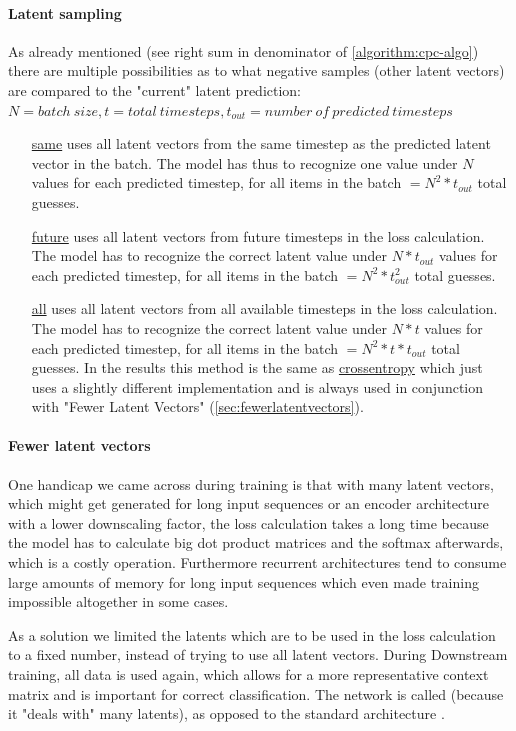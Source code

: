 \paragraph{Latent sampling}
As already mentioned (see right sum in denominator of \autoref{algorithm:cpc-algo}) there are multiple possibilities as to what negative samples (other latent vectors) are compared to the "current" latent prediction:
$N = \mathit{batch\ size}, t=\mathit{total\ timesteps}, t_{out}=\mathit{number\ of\ predicted\ timesteps}$
\begin{itemize}
	\item[\underline{same}] uses all latent vectors from the same timestep as the predicted latent vector in the batch. The model has thus to recognize one value under $N$ values for each predicted timestep, for all items in the batch $=N^2*t_{out}$ total guesses.
	\item[\underline{future}] uses all latent vectors from future timesteps in the loss calculation. The model has to recognize the correct latent value under $N*t_{out}$ values for each predicted timestep, for all items in the batch $=N^2*t_{out}^2$ total guesses.
	\item[\underline{all}] uses all latent vectors from all available timesteps in the loss calculation. The model has to recognize the correct latent value under $N*t$ values for each predicted timestep, for all items in the batch $=N^2*t*t_{out}$ total guesses. In the results this method is the same as \underline{crossentropy} which just uses a slightly different implementation and is always used in conjunction with "Fewer Latent Vectors" (\autoref{sec:fewerlatentvectors}).
\end{itemize}

\paragraph{Fewer latent vectors}\label{sec:fewerlatentvectors}
One handicap we came across during training is that with many latent vectors, which might get generated for long input sequences or an encoder architecture with a lower downscaling factor, the loss calculation takes a long time because the model has to calculate big dot product matrices and the softmax afterwards, which is a costly operation. Furthermore recurrent architectures tend to consume large amounts of memory for long input sequences which even made training impossible altogether in some cases.

As a solution we limited the latents which are to be used in the loss calculation to a fixed number, instead of trying to use all latent vectors. During Downstream training, all data is used again, which allows for a more representative context matrix and is important for correct classification. The network is called  (because it "deals with" many latents), as opposed to the standard architecture .

